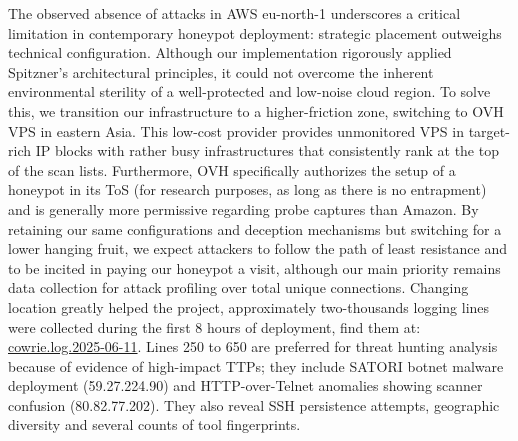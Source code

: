 \documentclass{cls/ULBreport}
\begin{document}
The observed absence of attacks in AWS eu-north-1 underscores a critical limitation in contemporary honeypot deployment: strategic placement outweighs technical configuration. Although our implementation rigorously applied Spitzner’s architectural principles, it could not overcome the inherent environmental sterility of a well-protected and low-noise cloud region. To solve this, we transition our infrastructure to a higher-friction zone, switching to OVH VPS in eastern Asia. This low-cost provider provides unmonitored VPS in target-rich IP blocks with rather busy infrastructures that consistently rank at the top of the scan lists. Furthermore, OVH specifically authorizes the setup of a honeypot in its ToS (for research purposes, as long as there is no entrapment) and is generally more permissive regarding probe captures than Amazon. By retaining our same configurations and deception mechanisms but switching for a lower hanging fruit, we expect attackers to follow the path of least resistance and to be incited in paying our honeypot a visit, although our main priority remains data collection for attack profiling over total unique connections. Changing location greatly helped the project, approximately two-thousands logging lines were collected during the first 8 hours of deployment, find them at: \href{https://github.com/nottoBD/cloud-honeypot/blob/master/log/cowrie.log.2025-06-11}{cowrie.log.2025-06-11}. Lines 250 to 650 are preferred for threat hunting analysis because of evidence of high-impact TTPs; they include SATORI botnet malware deployment (59.27.224.90) and HTTP-over-Telnet anomalies showing scanner confusion (80.82.77.202). They also reveal SSH persistence attempts, geographic diversity and several counts of tool fingerprints.
\end{document}
